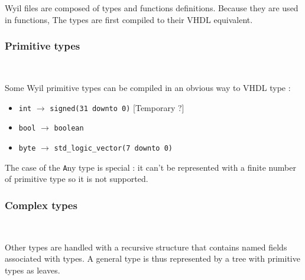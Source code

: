 \documentclass[10pt,a4paper]{article}
\newcommand{\code}{\texttt}
\renewcommand{\indent}{~\\\vspace{-.8cm}}
\begin{document}
Wyil files are composed of types and functions definitions. Because they are used in functions, The types are first compiled to their VHDL equivalent.

\subsubsection{Primitive types}
\indent

Some Wyil primitive types can be compiled in an obvious way to VHDL type :

\begin{itemize}
	\item \code{int} $\longrightarrow$ \code{signed(31 downto 0)} [Temporary ?]
	\item \code{bool} $\longrightarrow$ \code{boolean}
	\item \code{byte} $\longrightarrow$ \code{std\_logic\_vector(7 downto 0)}
\end{itemize}

The case of the \code Any type is special : it can't be represented with a finite number of primitive type so it is not supported.

\subsubsection{Complex types}
\indent

Other types are handled with a recursive structure that contains named fields associated with types. A general type is thus represented by a tree with primitive types as leaves.
\end{document}

